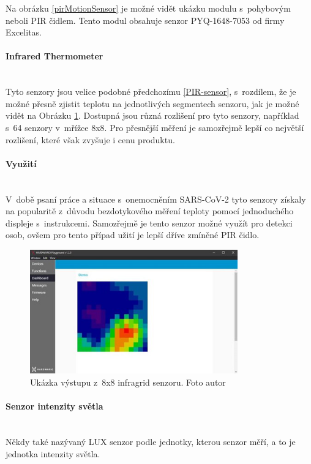 Na obrázku \ref{pirMotionSensor} je možné vidět ukázku modulu s~pohybovým neboli PIR čidlem. Tento modul obsahuje senzor PYQ-1648-7053 od firmy Excelitas.

\paragraph*{Infrared Thermometer}\mbox{} \\
Tyto senzory jsou velice podobné předchozímu \ref{PIR-sensor}, s~rozdílem, že je možné přesně zjistit teplotu na jednotlivých segmentech senzoru, jak je možné vidět na Obrázku \ref{infragridShowcase}. Dostupná jsou různá rozlišení pro tyto senzory, například s~64 senzory v~mřížce 8x8. Pro přesnější měření je samozřejmě lepší co největší rozlišení, které však zvyšuje i cenu produktu.

\paragraph*{Využití}\mbox{} \\
V~době psaní práce a situace s~onemocněním SARS-CoV-2 tyto senzory získaly na popularitě z~důvodu bezdotykového měření teploty pomocí jednoduchého displeje s~instrukcemi. Samozřejmě je tento senzor možné využít pro detekci osob, ovšem pro tento případ užití je lepší dříve zmíněné PIR čidlo.

\begin{figure}[H]
  \centering
  \includegraphics[width=0.8\textwidth]{obrazky-figures/hardwareComponents/infragridSensor.png}
  \caption{Ukázka výstupu z~8x8 infragrid senzoru. Foto autor}
  \label{infragridShowcase}
\end{figure}

\paragraph*{Senzor intenzity světla}\mbox{} \\
Někdy také nazývaný LUX senzor podle jednotky, kterou senzor měří, a to je jednotka intenzity světla. 

